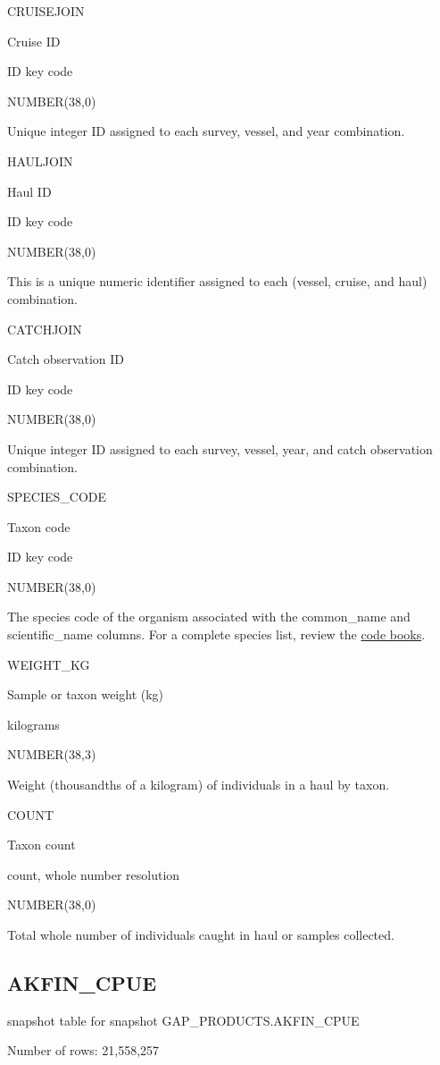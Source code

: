 \documentclass[
  letterpaper,
  oneside,
  open=any]{scrbook}
\begin{document}
CRUISEJOIN

Cruise ID

ID key code

NUMBER(38,0)

Unique integer ID assigned to each survey, vessel, and year combination.

HAULJOIN

Haul ID

ID key code

NUMBER(38,0)

This is a unique numeric identifier assigned to each (vessel, cruise,
and haul) combination.

CATCHJOIN

Catch observation ID

ID key code

NUMBER(38,0)

Unique integer ID assigned to each survey, vessel, year, and catch
observation combination.

SPECIES\_CODE

Taxon code

ID key code

NUMBER(38,0)

The species code of the organism associated with the common\_name and
scientific\_name columns. For a complete species list, review the
\href{https://www.fisheries.noaa.gov/resource/document/groundfish-survey-species-code-manual-and-data-codes-manual}{code
books}.

WEIGHT\_KG

Sample or taxon weight (kg)

kilograms

NUMBER(38,3)

Weight (thousandths of a kilogram) of individuals in a haul by taxon.

COUNT

Taxon count

count, whole number resolution

NUMBER(38,0)

Total whole number of individuals caught in haul or samples collected.

\subsection{AKFIN\_CPUE}\label{akfin_cpue}

snapshot table for snapshot GAP\_PRODUCTS.AKFIN\_CPUE

Number of rows: 21,558,257
\end{document}
